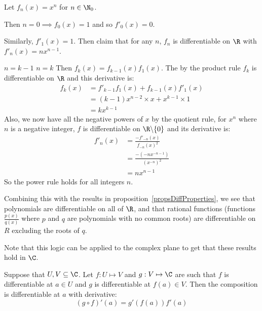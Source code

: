 \documentclass[../Main.tex]{subfiles}
\begin{document}
\begin{example}
    Let $f_n(x) = x^n$ for $n \in \N_0$.\par
    Then $n = 0 \implies f_0(x) = 1$ and so $f'_0(x) = 0$.\par
    Similarly, $f'_1(x) = 1$. Then claim that for any $n$, $f_n$ is differentiable on $\R$ with $f'_n(x) = nx^{n-1}$.\par
    {$n = k-1$}{}
    {$n = k$}{
        Then $f_k(x) = f_{k-1}(x) f_1(x)$. The by the product rule $f_k$ is differentiable on $\R$ and this derivative is:
        \begin{align*}
            f_k(x) &= f'_{k-1} f_1(x) + f_{k-1}(x) f'_1(x) \\
            &= (k-1)x^{n-2} \times x + x^{k-1} \times 1 \\
            &= kx^{k-1}
        \end{align*}
    }
    Also, we now have all the negative powers of $x$ by the quotient rule, for $x^n$ where $n$ is a negative integer, $f$ is differentiable on $\R \backslash \{0\}$ and its derivative is:
    \begin{align*}
        f'_n(x) &= \frac{-f'_{-n}(x)}{f_{-n}(x)^2} \\
        &= \frac{-(-nx^{-n-1})}{\left(x^{-n}\right)^2} \\
        &= nx^{n-1}
    \end{align*}
    So the power rule holds for all integers $n$.
    \label{exPowerRule}
\end{example}
Combining this with the results in proposition~\ref{propsDiffProperties}, we see that polynomials are differentiable on all of $\R$, and that rational functions (functions $\frac{p(x)}{q(x)}$ where $p$ and $q$ are polynomials with no common roots) are differentiable on $R$ excluding the roots of $q$.\par
Note that this logic can be applied to the complex plane to get that these results hold in $\C$.
\begin{theorem}
    Suppose that $U, V \subseteq \C$. Let $f : U \mapsto V$ and $g : V \mapsto \C$ are such that $f$ is differentiable at $a \in U$ and $g$ is differentiable at $f(a) \in V$. Then the composition is differentiable at $a$ with derivative:
    \begin{equation}
        (g \circ f)'(a) = g'(f(a)) f'(a)
        \label{eqnChainRule}
    \end{equation}
    \label{thmChainRule}
\end{theorem}
\end{document}
